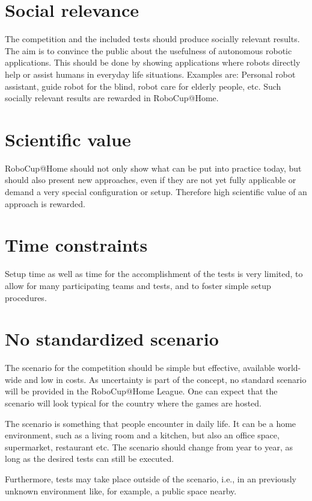\section{Social relevance}
\label{concept:social_relevance}
The competition and the included tests should produce socially relevant results. The aim is to convince the public about the usefulness of autonomous robotic applications. This should be done by showing applications where robots directly help or assist humans in everyday life situations. Examples are: Personal robot assistant, guide robot for the blind, robot care for elderly people, etc. Such socially relevant results are rewarded in RoboCup@Home.

\section{Scientific value}
\label{concept:scientific_value}
RoboCup@Home should not only show what can be put into practice today, but should also present new approaches, even if they are not yet fully applicable or demand a very special configuration or setup. Therefore high scientific value of an approach is rewarded.

\section{Time constraints}
\label{concept:time_constraints}
Setup time as well as time for the accomplishment of the tests is very limited, to allow for many participating teams and tests, and to foster simple setup procedures.

\section{No standardized scenario}
\label{concept:no_standardized_scenario}
The scenario for the competition should be simple but effective, available world-wide and low in costs. As uncertainty is part of the concept, no standard scenario will be provided in the RoboCup@Home League. One can expect that the scenario will look typical for the country where the games are hosted.

The scenario is something that people encounter in daily life. It can be a home environment, such as a living room and a kitchen, but also an office space, supermarket, restaurant etc. The scenario should change from year to year, as long as the desired tests can still be executed.

Furthermore, tests may take place outside of the scenario, i.e., in an previously unknown environment like, for example, a public space nearby.

